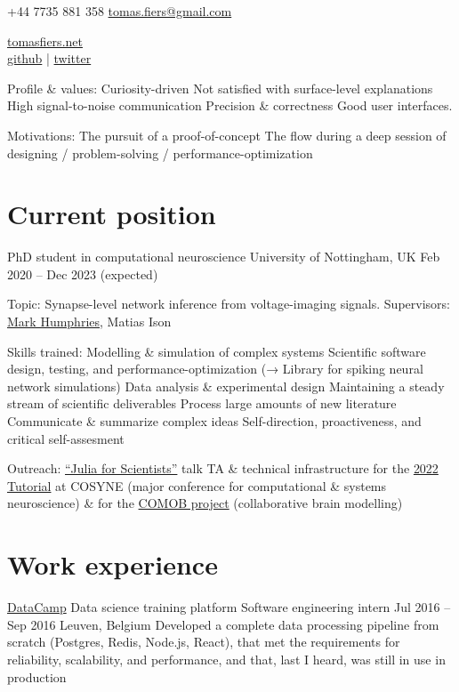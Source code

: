 \documentclass[a4]{article}
\author{Tomas Fiers}
\makeatletter
\def\email{tomas.fiers@gmail.com}
\def\phoneUK{+44 7735 881 358}
\def\phone{\phoneUK}
\def\website{tomasfiers.net}
\def\github{tfiers}
\def\twitter{TomasFiers}
\makeatother
\begin{document}
{\large\phone}
\href{mailto:\email}{\email}

\makeatletter  %
{\huge\@author}
\makeatother

\href{https://\website}{\large\website} \\
\href{https://github.com/\github}{github} |
\href{https://twitter.com/\twitter}{twitter}


Profile \& values:
Curiosity-driven
Not satisfied with surface-level explanations
High signal-to-noise communication
Precision \& correctness
Good user interfaces.

Motivations:
The pursuit of a proof-of-concept
The flow  during a deep session of designing / problem-solving / performance-optimization



\section{Current position}

PhD student in computational neuroscience
University of Nottingham, UK
Feb 2020  –  Dec  2023  (expected)

Topic:  Synapse-level network inference from voltage-imaging signals.
Supervisors:  \href{https://humphries-lab.org}{Mark Humphries}, Matias Ison

Skills trained:
Modelling \& simulation of complex systems
Scientific software design, testing, and performance-optimization (→ Library for spiking neural network simulations)
Data analysis \& experimental design
Maintaining a steady stream of scientific deliverables
Process large amounts of new literature
Communicate \& summarize complex ideas
Self-direction, proactiveness, and critical self-assesment

Outreach:
\href{https://tomasfiers.net/posts/julia-for-scientists}{``Julia for Scientists''} talk
TA \& technical infrastructure for the \href{https://github.com/neural-reckoning/cosyne-tutorial-2022}{2022 Tutorial} at COSYNE (major conference for computational \& systems neuroscience) \& for the \href{https://comob-project.github.io}{COMOB project} (collaborative brain modelling)



\section{Work experience}

\href{https://www.datacamp.com}{DataCamp}
Data science training platform
Software engineering intern
Jul 2016  –  Sep 2016
Leuven, Belgium
Developed a complete data processing pipeline from scratch (Postgres, Redis, Node.js, React), that met the requirements for reliability, scalability, and performance, and that, last I heard, was still in use in production
\end{document}
